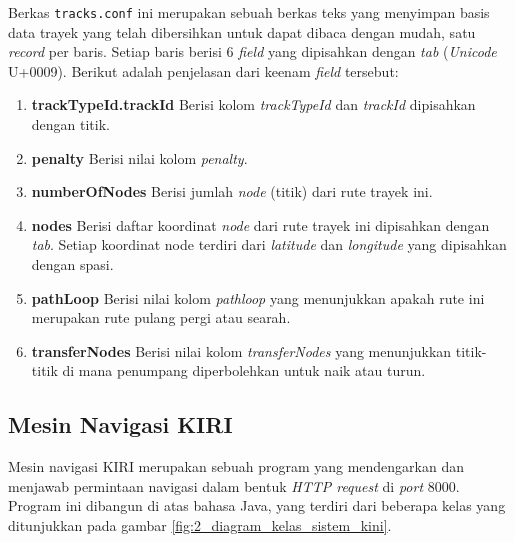 Berkas \texttt{tracks.conf} ini merupakan sebuah berkas teks yang menyimpan basis data trayek yang telah dibersihkan untuk dapat dibaca dengan mudah, satu \textit{record} per baris. Setiap baris berisi 6 \textit{field} yang dipisahkan dengan \textit{tab} (\textit{Unicode} U+0009\cite{unicode8}). Berikut adalah penjelasan dari keenam \textit{field} tersebut:

\begin{enumerate}
	\item \textbf{trackTypeId.trackId} Berisi kolom \textit{trackTypeId} dan \textit{trackId} dipisahkan dengan titik.
	\item \textbf{penalty} Berisi nilai kolom \textit{penalty}.
	\item \textbf{numberOfNodes} Berisi jumlah \textit{node} (titik) dari rute trayek ini.
	\item \textbf{nodes} Berisi daftar koordinat \textit{node} dari rute trayek ini dipisahkan dengan \textit{tab}. Setiap koordinat node terdiri dari \textit{latitude} dan \textit{longitude} yang dipisahkan dengan spasi.
	\item \textbf{pathLoop} Berisi nilai kolom \textit{pathloop} yang menunjukkan apakah rute ini merupakan rute pulang pergi atau searah.
	\item \textbf{transferNodes} Berisi nilai kolom \textit{transferNodes} yang menunjukkan titik-titik di mana penumpang diperbolehkan untuk naik atau turun.
\end{enumerate}

\subsection{Mesin Navigasi KIRI}

Mesin navigasi KIRI merupakan sebuah program yang mendengarkan dan menjawab permintaan navigasi dalam bentuk \textit{HTTP request} \cite{rfc7231} di \textit{port} 8000. Program ini dibangun di atas bahasa Java, yang terdiri dari beberapa kelas yang ditunjukkan pada gambar \ref{fig:2_diagram_kelas_sistem_kini}.

